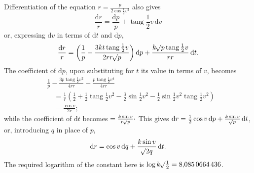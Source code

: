 Differentiation of the equation $r=\frac{p}{2\cos\frac{1}{2}v^2}$ also gives
\[
\frac{\mathrm{d}r}{r}=\frac{\mathrm{d}p}{p}+\operatorname{tang}\frac{1}{2}v\,\mathrm{d}v
\]
or, expressing $\mathrm{d}v$ in terms of $\mathrm{d}t$ and $\mathrm{d}p$,
\[
\frac{\mathrm{d}r}{r}=\left(\frac{1}{p}-\frac{3k t\operatorname{tang}\frac{1}{2}v}{2r r\mathord{{}^{}\!\surd}p}\right)\mathrm{d}p+\frac{k\mathord{{}^{}\!\surd}p\operatorname{tang}\frac{1}{2}v}{r r}\,\mathrm{d}t.
\]
The coefficient of $\mathrm{d}p$, upon substituting for $t$ its value in terms of $v$, becomes
\[
\begin{aligned}
&\frac{1}{p}-\frac{3p\operatorname{tang}\frac{1}{2}v^2}{4r r}-\frac{p\operatorname{tang}\frac{1}{2}v^4}{4r r}\\
&\quad=\frac{1}{r}\left(\frac{1}{2}+\frac{1}{2}\operatorname{tang}\frac{1}{2}v^2-\frac{3}{2}\sin\frac{1}{2}v^2-\frac{1}{2}\sin\frac{1}{2}v^2\operatorname{tang}\frac{1}{2}v^2\right)\\
&\quad=\frac{\cos v}{2r};
\end{aligned}
\]
while the coefficient of $\mathrm{d}t$ becomes $=\frac{k\sin v}{r\mathord{{}^{}\!\surd}p}\cdot$ This gives $\mathrm{d}r=\frac{1}{2}\cos v\,\mathrm{d}p+\frac{k\sin v}{\mathord{{}^{}\!\surd}p}\,\mathrm{d}t$, or, introducing $q$ in place of $p$,
\[
\mathrm{d}r=\cos v\,\mathrm{d}q+\frac{k\sin v}{\mathord{{}^{}\!\surd}2q}\,\mathrm{d}t.
\]
The required logarithm of the constant here is $\log k\mathord{{}^{}\!\surd}\frac{1}{2}=8{,}085\,0664\,436$.
